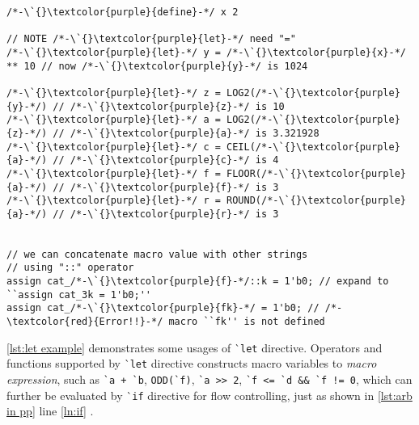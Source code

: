 \begin{lstlisting}[caption={\`{}\texttt{let} usage examples},label={lst:let example}]
/*-\`{}\textcolor{purple}{define}-*/ x 2

// NOTE /*-\`{}\textcolor{purple}{let}-*/ need "="
/*-\`{}\textcolor{purple}{let}-*/ y = /*-\`{}\textcolor{purple}{x}-*/ ** 10 // now /*-\`{}\textcolor{purple}{y}-*/ is 1024

/*-\`{}\textcolor{purple}{let}-*/ z = LOG2(/*-\`{}\textcolor{purple}{y}-*/) // /*-\`{}\textcolor{purple}{z}-*/ is 10
/*-\`{}\textcolor{purple}{let}-*/ a = LOG2(/*-\`{}\textcolor{purple}{z}-*/) // /*-\`{}\textcolor{purple}{a}-*/ is 3.321928
/*-\`{}\textcolor{purple}{let}-*/ c = CEIL(/*-\`{}\textcolor{purple}{a}-*/) // /*-\`{}\textcolor{purple}{c}-*/ is 4
/*-\`{}\textcolor{purple}{let}-*/ f = FLOOR(/*-\`{}\textcolor{purple}{a}-*/) // /*-\`{}\textcolor{purple}{f}-*/ is 3
/*-\`{}\textcolor{purple}{let}-*/ r = ROUND(/*-\`{}\textcolor{purple}{a}-*/) // /*-\`{}\textcolor{purple}{r}-*/ is 3


// we can concatenate macro value with other strings
// using "::" operator
assign cat_/*-\`{}\textcolor{purple}{f}-*/::k = 1'b0; // expand to ``assign cat_3k = 1'b0;''
assign cat_/*-\`{}\textcolor{purple}{fk}-*/ = 1'b0; // /*-\textcolor{red}{Error!!}-*/ macro ``fk'' is not defined 
\end{lstlisting}
\autoref{lst:let example} demonstrates some usages of \`{}\texttt{let} directive. 
Operators and functions supported by \`{}\texttt{let} directive constructs macro variables
to \emph{macro expression}, such as 
\mbox{\texttt{\`{}a + \`{}b}}, 
\mbox{\texttt{ODD(\`{}f)}}, 
\mbox{\texttt{\`{}a >> 2}}, 
\mbox{\texttt{\`{}f <= \`{}d \&\& \`{}f != 0}},
which can further be evaluated by \`{}\texttt{if} directive for flow controlling, 
just as shown in \autoref{lst:arb in pp} line \autoref{ln:if} . 
